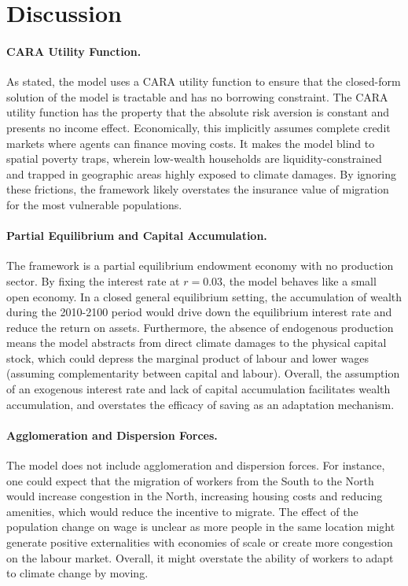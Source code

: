\documentclass[12pt, a4paper]{article}
\begin{document}
\section{Discussion}
\label{sec:discussion}

\paragraph{CARA Utility Function.}
As stated, the model uses a CARA utility function to ensure that the closed-form solution of the model is tractable and has no borrowing constraint. The CARA utility function has the property that the absolute risk aversion is constant and presents no income effect. Economically, this implicitly assumes complete credit markets where agents can finance moving costs. It makes the model blind to spatial poverty traps, wherein low-wealth households are liquidity-constrained and trapped in geographic areas highly exposed to climate damages. By ignoring these frictions, the framework likely overstates the insurance value of migration for the most vulnerable populations.

\paragraph{Partial Equilibrium and Capital Accumulation.}
The framework is a partial equilibrium endowment economy with no production sector. By fixing the interest rate at $r = 0.03$, the model behaves like a small open economy. In a closed general equilibrium setting, the accumulation of wealth during the 2010-2100 period would drive down the equilibrium interest rate and reduce the return on assets. Furthermore, the absence of endogenous production means the model abstracts from direct climate damages to the physical capital stock, which could depress the marginal product of labour and lower wages (assuming complementarity between capital and labour). Overall, the assumption of an exogenous interest rate and lack of capital accumulation facilitates wealth accumulation, and overstates the efficacy of saving as an adaptation mechanism.

\paragraph{Agglomeration and Dispersion Forces.}
The model does not include agglomeration and dispersion forces. For instance, one could expect that the migration of workers from the South to the North would increase congestion in the North, increasing housing costs and reducing amenities, which would reduce the incentive to migrate. The effect of the population change on wage is unclear as more people in the same location might generate positive externalities with economies of scale or create more congestion on the labour market. Overall, it might overstate the ability of workers to adapt to climate change by moving.
\end{document}
